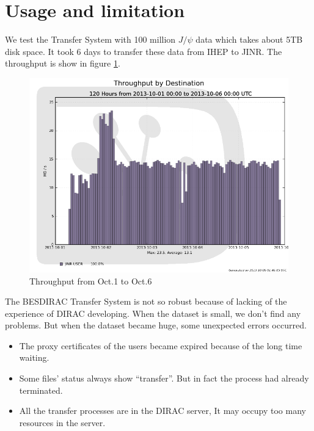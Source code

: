 \section{Usage and limitation}
We test the Transfer System with 100 million $J/\psi$ data 
which takes about 5TB disk space. It took 6 days to transfer 
these data from IHEP to JINR. The throughput is show in 
figure \ref{fig:throughput}.

\begin{figure}
    \begin{center}
        \includegraphics[width=\textwidth, keepaspectratio]{data/throughput-dest-1001-10-06.png}
    \end{center}
    \caption{\label{fig:throughput}Throughput from Oct.1 to Oct.6}
\end{figure}

The BESDIRAC Transfer System is not so robust
because of lacking of the experience of DIRAC developing.
When the dataset is small, we don't find any problems.
But when the dataset became huge, some unexpected errors occurred.
\begin{itemize}
    \item The proxy certificates of the users became expired
            because of the long time waiting.
    \item Some files' status always show ``transfer''.
            But in fact the process had already terminated.
    \item All the transfer processes are in the DIRAC server,
            It may occupy too many resources in the server.
\end{itemize}
